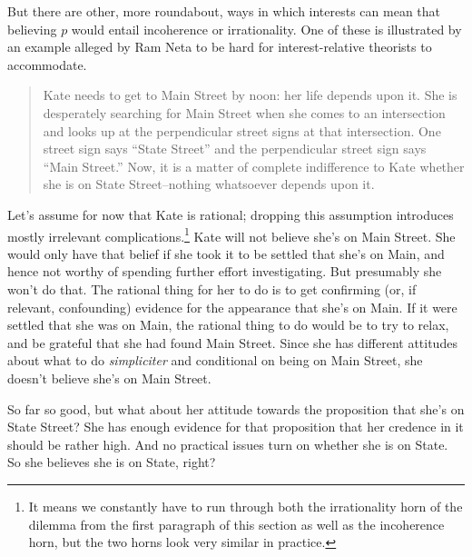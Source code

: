 \documentclass[oneside]{book}
\begin{document}
But there are other, more roundabout, ways in which interests can mean that believing $p$ would entail incoherence or irrationality. One of these is illustrated by an example alleged by Ram Neta to be hard for interest-relative theorists to accommodate.

\begin{quote}
Kate needs to get to Main Street by noon: her life depends upon it. She is desperately searching for Main Street when she comes to an intersection and looks up at the perpendicular street signs at that intersection. One street sign says ``State Street'' and the perpendicular street sign says ``Main Street.'' Now, it is a matter of complete indifference to Kate whether she is on State Street--nothing whatsoever depends upon it. \citep[182]{Neta2007}
\end{quote}

\noindent Let's assume for now that Kate is rational; dropping this assumption introduces mostly irrelevant complications.\footnote{It means we constantly have to run through both the irrationality horn of the dilemma from the first paragraph of this section as well as the incoherence horn, but the two horns look very similar in practice.} Kate will not believe she's on Main Street. She would only have that belief if she took it to be settled that she's on Main, and hence not worthy of spending further effort investigating. But presumably she won't do that. The rational thing for her to do is to get confirming (or, if relevant, confounding) evidence for the appearance that she's on Main. If it were settled that she was on Main, the rational thing to do would be to try to relax, and be grateful that she had found Main Street. Since she has different attitudes about what to do \textit{simpliciter} and conditional on being on Main Street, she doesn't believe she's on Main Street.

So far so good, but what about her attitude towards the proposition that she's on State Street? She has enough evidence for that proposition that her credence in it should be rather high. And no practical issues turn on whether she is on State. So she believes she is on State, right?
\end{document}
